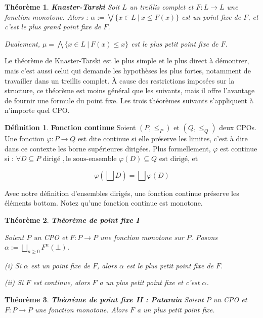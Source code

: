 \documentclass{article}
\newtheorem{theorem}{Théorème}[section]
\theoremstyle{definition}
\newtheorem{definition}{Définition}[section]
\begin{document}
\begin{theorem}{\textbf{Knaster-Tarski}}
Soit $L$ un treillis complet et $F : L \rightarrow L$ une fonction monotone. Alors :
$ \alpha := \bigvee \{x \in L ~|~ x \leq F(x)\}$
est un point fixe de $F$, et c'est le plus grand point fixe de $F$.

\noindent Dualement, $\mu = \bigwedge \{x \in L ~|~ F(x) \leq x\}$ est le plus petit point fixe de $F$.
\end{theorem}

Le théorème de Knaster-Tarski est le plus simple et le plus direct à démontrer, mais c'est aussi celui qui demande les hypothèses les plus fortes, notamment de travailler dans un treillis complet. À cause des restrictions imposées sur la structure, ce théorème est moins général que les suivants, mais il offre l'avantage de fournir une formule du point fixe. Les trois théorèmes suivants s'appliquent à n'importe quel CPO.

\begin{definition}{\textbf{Fonction continue}}
Soient $(P, \leq_P)$ et $(Q, \leq_Q)$ deux CPOs. Une fonction $\varphi : P \rightarrow Q$ est dite continue si elle préserve les limites, c'est à dire dans ce contexte les borne supérieures dirigées. Plus formellement, $\varphi$ est continue si :
$\forall D \subseteq P \text{ dirigé }, \text{le sous-ensemble } \varphi(D) \subseteq Q \text{ est dirigé, et }$

$$ \varphi(\bigsqcup D) = \bigsqcup \varphi(D) $$ 

Avec notre définition d'ensembles dirigés, une fonction continue préserve les éléments bottom.
Notez qu'une fonction continue est monotone.
\end{definition}

\begin{theorem}{\textbf{Théorème de point fixe I}}

Soient $P$ un CPO et $F : P \rightarrow P$ une fonction monotone sur $P$. Posons $\alpha := \bigsqcup_{n \geq 0}F^n(\bot)$.

(i) Si $\alpha$ est un point fixe de $F$, alors $\alpha$ est le plus petit point fixe de $F$.

(ii) Si $F$ est continue, alors $F$ a un plus petit point fixe et c'est $\alpha$.

\end{theorem}

\begin{theorem}{\textbf{Théorème de point fixe II : Pataraia}}
Soient $P$ un CPO et $F : P \rightarrow P$ une fonction monotone. Alors $F$ a un plus petit point fixe.
\end{theorem}
\end{document}

